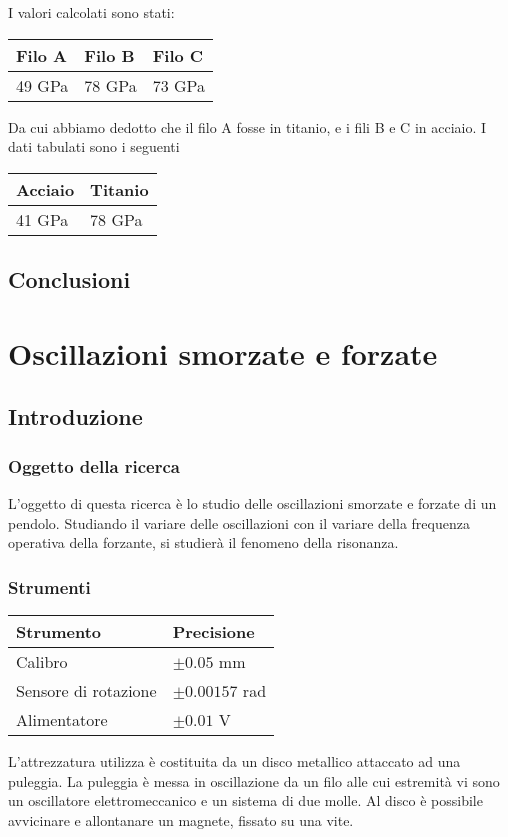 \documentclass[a4paper,10pt]{report}
\begin{document}
I valori calcolati sono stati:
\begin{center}
\begin{tabular}{lll}
Filo A & Filo B & Filo C \\
\midrule
49 GPa & 78 GPa & 73 GPa \\
\end{tabular}
\end{center}

Da cui abbiamo dedotto che il filo A fosse in titanio, e i fili B e C in acciaio.
I dati tabulati sono i seguenti
\begin{center}
\begin{tabular}{ll}
Acciaio & Titanio \\
\midrule
41 GPa & 78 GPa \\
\end{tabular}
\end{center}

\section{Conclusioni}

\chapter{Oscillazioni smorzate e forzate}

\section{Introduzione}
\subsection{Oggetto della ricerca}
L'oggetto di questa ricerca è lo studio delle oscillazioni smorzate e forzate di un pendolo. Studiando il variare delle oscillazioni con il variare della frequenza operativa della forzante, si studierà il fenomeno della risonanza.

\subsection{Strumenti}
\begin{center}
\begin{tabular}{l|l}
\midrule
Strumento & Precisione\\
\midrule
Calibro & $\pm 0.05$ mm\\ 
Sensore di rotazione & $\pm 0.00157$ rad\\ 
Alimentatore & $\pm 0.01$ V\\ 
\midrule 
\end{tabular}
\end{center}
L'attrezzatura utilizza è costituita da un disco metallico attaccato ad una puleggia. La puleggia è messa in oscillazione da un filo alle cui estremità vi sono un oscillatore  elettromeccanico e un sistema di due molle. Al disco è possibile avvicinare e allontanare un magnete, fissato su una vite. 
\end{document}
